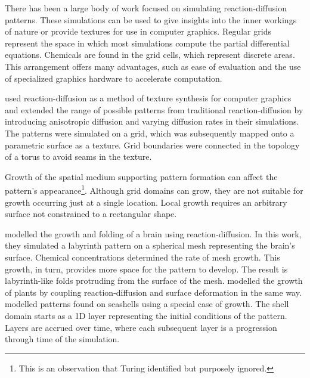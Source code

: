 
There has been a large body of work focused on simulating reaction-diffusion patterns. These simulations can be used to give insights into the inner workings of nature or provide textures for use in computer graphics. Regular grids represent the space in which most simulations compute the partial differential equations. Chemicals are found in the grid cells, which represent discrete areas. This arrangement offers many advantages, such as ease of evaluation and the use of specialized graphics hardware to accelerate computation.

\citet{witkin1991} used reaction-diffusion as a method of texture synthesis for computer graphics and extended the range of possible patterns from traditional reaction-diffusion by introducing anisotropic diffusion and varying diffusion rates in their simulations. The patterns were simulated on a grid, which was subsequently mapped onto a parametric surface as a texture. Grid boundaries were connected in the topology of a torus to avoid seams in the texture.

Growth of the spatial medium supporting pattern formation can affect the pattern's appearance\footnote{This is an observation that Turing identified but purposely ignored.}. Although grid domains can grow, they are not suitable for growth occurring just at a single location. Local growth requires an arbitrary surface not constrained to a rectangular shape.

\citet{lefevre2010} modelled the growth and folding of a brain using reaction-diffusion. In this work, they simulated a labyrinth pattern on a spherical mesh representing the brain's surface. Chemical concentrations determined the rate of mesh growth. This growth, in turn, provides more space for the pattern to develop. The result is labyrinth-like folds protruding from the surface of the mesh. \citet{harrison2002, holloway2007} modelled the growth of plants by coupling reaction-diffusion and surface deformation in the same way. \citet{fowler1992} modelled patterns found on seashells using a special case of growth. The shell domain starts as a 1D layer representing the initial conditions of the pattern. Layers are accrued over time, where each subsequent layer is a progression through time of the simulation.

